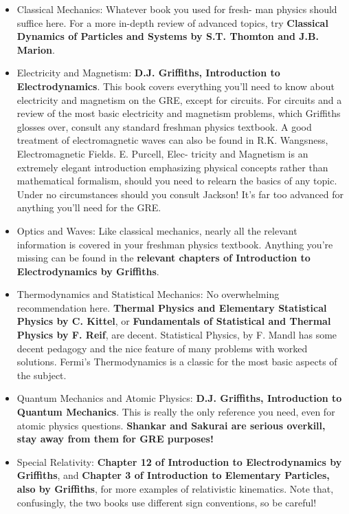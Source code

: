\begin{itemize}
  
\item Classical Mechanics: Whatever book you used for fresh-
man physics should suffice here. For a more in-depth review of advanced topics, try {\bf Classical Dynamics of Particles and Systems by S.T. Thomton and J.B. Marion}.


\item Electricity and Magnetism:  {\bf D.J. Griffiths, Introduction to Electrodynamics}. This book covers everything you'll need to know about electricity and magnetism on the GRE, except
for circuits. For circuits and a review of the most basic
electricity and magnetism problems, which Griffiths glosses over, consult any standard freshman physics textbook. A good treatment of electromagnetic waves can also be found in R.K. Wangsness, Electromagnetic Fields.
E. Purcell, Elec-
tricity and Magnetism is an extremely elegant introduction emphasizing physical concepts rather than mathematical formalism, should you need to relearn the basics of any topic. Under no circumstances should you consult Jackson! It's far too advanced for anything you'll need for the GRE.


\item Optics and Waves: Like classical mechanics, nearly all the relevant information is covered in your freshman physics
textbook. Anything you're missing can be found in the  {\bf relevant chapters of Introduction to Electrodynamics by Griffiths}.


\item Thermodynamics and Statistical Mechanics: No overwhelming recommendation here.  {\bf Thermal Physics and Elementary Statistical Physics by C. Kittel}, or  {\bf Fundamentals of Statistical and Thermal Physics by F. Reif}, are decent. Statistical Physics, by F. Mandl has some decent pedagogy and
the nice feature of many problems with worked solutions. Fermi's Thermodynamics is a classic for the most basic
aspects of the subject.


\item Quantum Mechanics and Atomic Physics:  {\bf  D.J. Griffiths, Introduction to Quantum Mechanics}. This is really the only
reference you need, even for atomic physics questions.  {\bf Shankar and Sakurai are serious overkill, stay away from them for GRE purposes!} 

\item Special Relativity:  {\bf Chapter 12 of Introduction to Electrodynamics by Griffiths}, and  {\bf Chapter 3 of Introduction to Elementary Particles, also by Griffiths}, for more examples of relativistic kinematics. Note that, confusingly, the two books use different sign conventions, so be careful!



\end{itemize}
